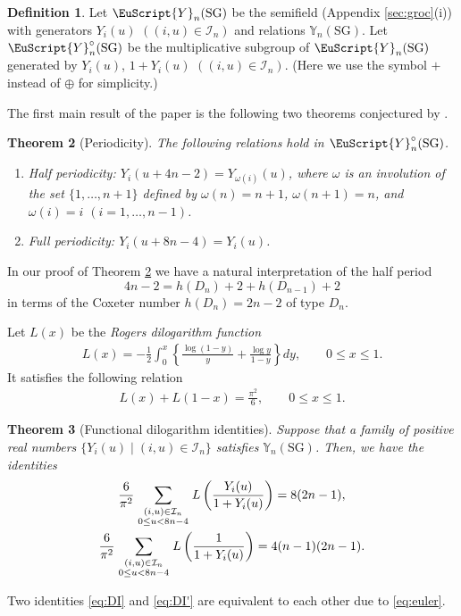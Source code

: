 \documentclass[pdftex]{sigma}
\numberwithin{equation}{section}
\newtheorem{Theorem}{Theorem}[section]
\theoremstyle{definition}
\newtheorem{Definition}[Theorem]{Definition}
\begin{document}
\begin{Definition}
\label{def:YC}
Let $\EuScript{Y}_{n}(\mathrm{SG})$
be the semif\/ield (Appendix \ref{sec:groc}(i)) with generators
$Y_i(u)$
 $((i,u)\in \mathcal{I}_{n})$
and relations $\mathbb{Y}_{n}(\mathrm{SG})$.
Let $\EuScript{Y}^{\circ}_{n}(\mathrm{SG})$
be the multiplicative subgroup
of $\EuScript{Y}_{n}(\mathrm{SG})$
generated by
$Y_i(u)$, $1+Y_i(u)$
 $((i,u)\in \mathcal{I}_{n})$.
(Here we use the symbol $+$ instead of $\oplus$
for simplicity.)
\end{Definition}
The f\/irst main result of the paper is
the following two theorems conjectured by
\cite{Tateo95}.

\begin{Theorem}[Periodicity]
\label{thm:Yperiod}
The following relations hold in $\EuScript{Y}^{\circ}_{n}(\mathrm{SG})$.
\begin{enumerate}\itemsep=0pt
\item[$(i)$] Half periodicity: $Y_i(u+4n-2)=Y_{\omega(i)}(u)$, where
$\omega$ is an involution of the set $\{1,\dots,n+1\}$
defined by $\omega(n)=n+1$, $\omega(n+1)=n$,
and $\omega(i)=i$ $(i=1,\dots,n-1)$.
\item[$(ii)$] Full periodicity: $Y_i(u+8n-4)=Y_i(u)$.
\end{enumerate}
\end{Theorem}

In our proof of Theorem \ref{thm:Yperiod}
we have  a natural interpretation
of the  half period
\[
4n-2=h(D_n)+2+h(D_{n-1})+2
\]
in terms of the Coxeter number  $h(D_n)=2n-2$ of type $D_n$.

Let $L(x)$ be the {\em Rogers dilogarithm function\/}
 \cite{Lewin81}
\begin{gather*}
L(x)=-\frac{1}{2}\int_{0}^x
\left\{ \frac{\log(1-y)}{y}+
\frac{\log y}{1-y}
\right\} dy,
\qquad 0\leq x\leq 1.
\end{gather*}
It satisf\/ies the following relation
\begin{gather}
\label{eq:euler}
L(x)+L(1-x)=\frac{\pi^2}{6},
\qquad 0\leq x\leq 1.
\end{gather}

\begin{Theorem}[Functional dilogarithm identities]
\label{thm:dilog}
Suppose that a family of positive real numbers
$\{ Y_i(u) \mid (i,u)\in \mathcal{I}_n\}$ satisfies
$\mathbb{Y}_n(\mathrm{SG})$.
Then, we have the identities
\begin{gather}
\label{eq:DI}
\frac{6}{\pi^2}
\sum_{
\genfrac{}{}{0pt}{1}
{
(i,u)\in \mathcal{I}_{n}
}
{
0\leq u < 8n-4
}
}
L\left(
\frac{Y_i(u)}{1+Y_i(u)}
\right)
 =8(2n-1),\\
\label{eq:DI'}
\frac{6}{\pi^2}
\sum_{
\genfrac{}{}{0pt}{1}
{
(i,u)\in \mathcal{I}_{n}
}
{
0\leq u < 8n-4
}
}
L\left(
\frac{1}{1+Y_i(u)}
\right)
 =4(n-1)(2n-1).
\end{gather}
\end{Theorem}
Two identities
\eqref{eq:DI} and \eqref{eq:DI'}
are equivalent to each other due to \eqref{eq:euler}.
\end{document}
